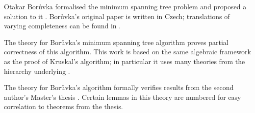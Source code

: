 \documentclass[11pt,a4paper]{article}
\begin{document}
Otakar Bor\r{u}vka formalised the minimum spanning tree problem and proposed a solution to it \cite{Boruvka1926}.
Bor\r{u}vka's original paper is written in Czech; translations of varying completeness can be found in \cite{GrahamHell1985,NesetrilMilkovaNesetrilova2001}.

The theory for Bor\r{u}vka's minimum spanning tree algorithm proves partial correctness of this algorithm.
This work is based on the same algebraic framework as the proof of Kruskal's algorithm; in particular it uses many theories from the hierarchy underlying \cite{Guttmann2018a}.

The theory for Bor\r{u}vka's algorithm formally verifies results from the second author's Master's thesis \cite{RobinsonOBrien2020}.
Certain lemmas in this theory are numbered for easy correlation to theorems from the thesis.

\begin{flushleft}

\end{flushleft}



\end{document}
